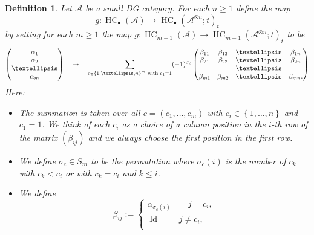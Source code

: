 \documentclass[10pt,a4paper]{amsart}
\def\A{{\mathcal{A}}}
\newtheorem{defn}{Definition}
\DeclareMathOperator{\hochcx}{{HC}}
\DeclareMathOperator{\id}{Id}
\begin{document}
\begin{defn}
\label{defn-the-map-g}
Let $\A$ be a small DG category. For each $n \geq 1$ define the map 
$$ g \colon 
\hochcx_\bullet(\A)
\rightarrow 
\hochcx_\bullet(\A^{\otimes n};t)_t
$$
by setting for each $m \geq 1$ the map 
$g \colon 
\hochcx_{m-1}(\A)
\rightarrow 
\hochcx_{m-1}(\A^{\otimes n};t)_t$
to be
\begin{equation}
\label{eqn-quasi-iso-g-long-cycle}
\begin{pmatrix}
\alpha_{1} \\
\alpha_{2} \\
\dots
\\
\alpha_{m} 
\end{pmatrix}
\quad \mapsto \quad 
\sum_{c \in \left\{1,\dots,n\right\}^{m}
\\
\text{ with } c_1 = 1
}
(-1)^{\sigma_{c}}
\begin{pmatrix}
\beta_{11} & \beta_{12} & \dots & \beta_{1n}  
\\
\beta_{21} & \beta_{22} & \dots & \beta_{2n}  
\\
& & \dots & 
\\
\beta_{m1} & \beta_{m2} & \dots & \beta_{mn}.
\end{pmatrix}
\end{equation}
Here: 
\begin{itemize}
\item The summation is taken over all $c = (c_1, \dots, c_m)$ with 
$c_i \in \left\{1, \dots, n\right\}$ and $c_1 = 1$.
We think of each $c_i$ as a choice of a column position in the $i$-th row 
of the matrix $(\beta_{ij})$ and we always choose 
the first position in the first row.
\item We define $\sigma_c \in S_m$ to be 
the permutation where $\sigma_c(i)$ is 
the number of $c_k$ with $c_k < c_i$ or with
$c_k = c_i$ and $k \leq i$. 
\item We define
\begin{equation*}
\beta_{ij} := 
\begin{cases}
\alpha_{\sigma_c(i)} \quad \quad j = c_i, \\ 
\id \quad \quad \; j \neq c_i, \\ 
\end{cases}
\end{equation*}
\end{itemize}
\end{defn}
\end{document}
